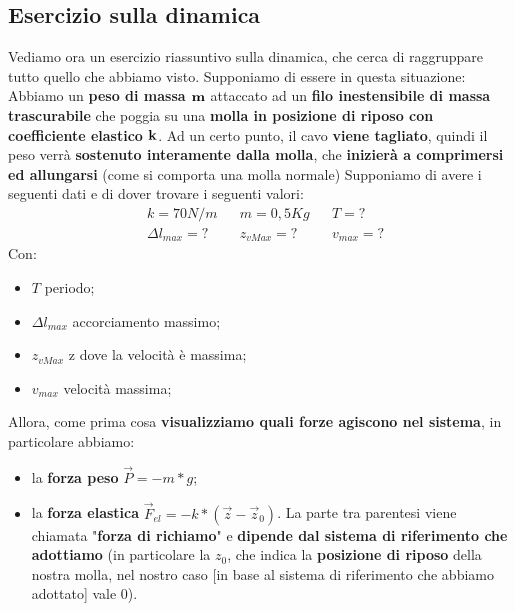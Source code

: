     \subsection{Esercizio sulla dinamica}
        Vediamo ora un esercizio riassuntivo sulla dinamica, che cerca di raggruppare tutto quello che abbiamo visto. Supponiamo di essere in questa situazione:
        Abbiamo un \textbf{peso di massa $\bf{m}$} attaccato ad un \textbf{filo inestensibile di massa trascurabile} che poggia su una \textbf{molla in posizione di riposo con coefficiente elastico $\bf{k}$}. Ad un certo punto, il cavo \textbf{viene tagliato}, quindi il peso verrà \textbf{sostenuto interamente dalla molla}, che \textbf{inizierà a comprimersi ed allungarsi} (come si comporta una molla normale)
        Supponiamo di avere i seguenti dati e di dover trovare i seguenti valori:
        \begin{align*}
            & k = 70 N/m&& m = 0,5 Kg && T = ?\\
            &\Delta l_{max} = ? && z_{vMax}=? && v_{max}=?
        \end{align*}
        Con:
        \begin{itemize}
            \item $T$ periodo;
            \item $\Delta l_{max}$ accorciamento massimo;
            \item $z_{vMax}$ z dove la velocità è massima;
            \item $v_{max}$ velocità massima;
        \end{itemize}
        Allora, come prima cosa \textbf{visualizziamo quali forze agiscono nel sistema}, in particolare abbiamo:
        \begin{itemize}
            \item la \textbf{forza peso} $\vec{P}=-m*g$;
            \item la \textbf{forza elastica} $\vec{F}_{el}=-k*(\vec{z}-\vec{z}_0)$. La parte tra parentesi viene chiamata "\textbf{forza di richiamo}" e \textbf{dipende dal sistema di riferimento che adottiamo} (in particolare la $z_0$, che indica la \textbf{posizione di riposo} della nostra molla, nel nostro caso [in base al sistema di riferimento che abbiamo adottato] vale 0).
        \end{itemize}


